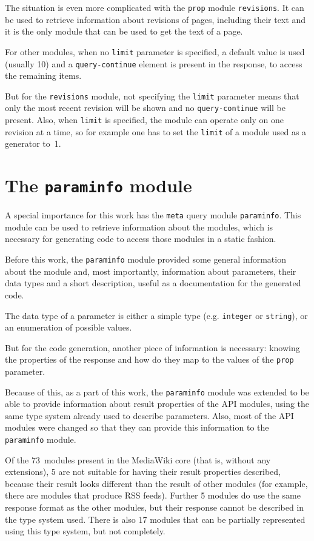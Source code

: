 The situation is even more complicated with the \texttt{prop} module \texttt{revisions}.
It can be used to retrieve information about revisions of pages, including their text
and it is the only module that can be used to get the text of a page.

For other modules, when no \texttt{limit} parameter is specified, a default value is used (usually 10)
and a \texttt{query-continue} element is present in the response, to access the remaining items.

But for the \texttt{revisions} module, not specifying the \texttt{limit} parameter means that only the most
recent revision will be shown and no \texttt{query-continue} will be present.
Also, when \texttt{limit} is specified, the module can operate only on one revision at a time,
so for example one has to set the \texttt{limit} of a module used as a generator to~1.

\section{The \texttt{paraminfo} module}

A special importance for this work has the \texttt{meta} query module \texttt{paraminfo}.
This module can be used to retrieve information about the modules,
which is necessary for generating code to access those modules in a static fashion.

Before this work, the \texttt{paraminfo} module provided some general information about the module
and, most importantly, information about parameters, their data types and a short description,
useful as a documentation for the generated code.

The data type of a parameter is either a simple type (e.g. \texttt{integer} or \texttt{string}),
or an enumeration of possible values.

But for the code generation, another piece of information is necessary:
knowing the properties of the response and how do they map to the values of the \texttt{prop} parameter.

Because of this, as a part of this work,
the \texttt{paraminfo} module was extended to be able to provide information about result properties
of the API modules, using the same type system already used to describe parameters.
Also, most of the API modules were changed so that they can provide this information to the \texttt{paraminfo} module.

Of the 73~modules present in the MediaWiki core (that is, without any extensions),
5 are not suitable for having their result properties described,
because their result looks different than the result of other modules (for example, there are modules that produce RSS feeds).
Further 5 modules do use the same response format as the other modules,
but their response cannot be described in the type system used.
There is also 17 modules that can be partially represented using this type system, but not completely.

